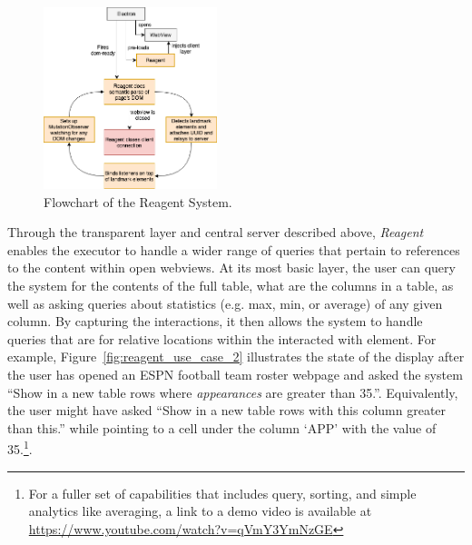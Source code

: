 \begin{figure}
\centering
\includegraphics[width=0.45\textwidth]{chapters/03_reagent/figures/reagent.png}
\caption{Flowchart of the Reagent System.}
\label{fig:reagent}
\end{figure}

Through the transparent layer and central server described above, \textit{Reagent} enables
the executor to handle a wider range of queries that pertain to references
to the content within open webviews. At its most basic layer, the user can
query the system for the contents of the full table, what are the columns in a
table, as well as asking queries about statistics (e.g. max, min, or average)
of any given column. By capturing the interactions, it then allows the system
to handle queries that are for relative locations within the interacted with
element. For example, Figure~\ref{fig:reagent_use_case_2} illustrates the state of the
display after the user has opened an ESPN football team roster webpage and
asked the system ``Show in a new table rows where \textit{appearances} are
greater than 35.''. Equivalently, the user might have asked ``Show in a new
table rows with this column greater than this.'' while pointing to a cell
under the column `APP' with the value of 35.\footnote{For a fuller set of
capabilities that includes query, sorting, and simple analytics like averaging,
a link to a demo video is available at
\url{https://www.youtube.com/watch?v=qVmY3YmNzGE}}.
